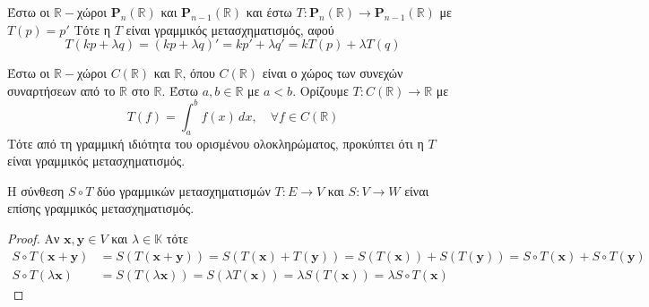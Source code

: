\begin{example}
  Έστω οι $ \mathbb{R} - $χώροι $ \textbf{P}_{n}(\mathbb{R}) $ και $
  \textbf{P}_{n-1}(\mathbb{R}) $ και έστω $ T \colon \textbf{P}_{n}(\mathbb{R}) \to 
  \textbf{P}_{n-1}(\mathbb{R}) $ με 
  $ T(p) = p' $
  Τότε η $T$ είναι γραμμικός μετασχηματισμός, αφού 
  \[
    T(kp + \lambda q) = (kp+ \lambda q)' = kp' + \lambda q' = k T(p) + \lambda T(q)
  \] 
\end{example}

\begin{example}
  Έστω οι $ \mathbb{R} - $χώροι $ C(\mathbb{R}) $ και $ \mathbb{R} $, όπου 
  $ C(\mathbb{R}) $ είναι ο χώρος των συνεχών συναρτήσεων από το $ \mathbb{R} $ στο 
  $ \mathbb{R} $. Έστω $ a,b \in \mathbb{R} $ με $ a<b $. Ορίζουμε 
  $ T \colon C(\mathbb{R}) \to \mathbb{R}$ με 
  \[
    T(f) = \int _{a}^{b} f(x) \,{dx}, \quad \forall f \in C(\mathbb{R}) 
  \] 
  Τότε από τη γραμμική ιδιότητα του ορισμένου ολοκληρώματος, προκύπτει ότι 
  η $T$ είναι γραμμικός μετασχηματισμός.
\end{example}

\begin{prop}
  Η σύνθεση $ S \circ T $ δύο γραμμικών μετασχηματισμών $ T \colon E \to V $ και 
  $ S \colon V \to W $ είναι επίσης γραμμικός μετασχηματισμός.
\end{prop}
\begin{proof}
  Αν $ \mathbf{x}, \mathbf{y} \in V $ και $ \lambda \in \mathbb{K} $ τότε
  \begin{align*}
    S \circ T (\mathbf{x}+ \mathbf{y}) &= S(T(\mathbf{x}+ \mathbf{y})) =
    S(T(\mathbf{x})+T(\mathbf{y})) = S(T(\mathbf{x})) + S(T(\mathbf{y})) = 
    S \circ T (\mathbf{x}) + S \circ T (\mathbf{y}) \\
    S \circ T(\lambda \mathbf{x}) &= S(T(\lambda \mathbf{x})) = 
    S(\lambda T(\mathbf{x})) = \lambda S(T(\mathbf{x})) = \lambda S \circ T (\mathbf{x})
  \end{align*}
\end{proof}


